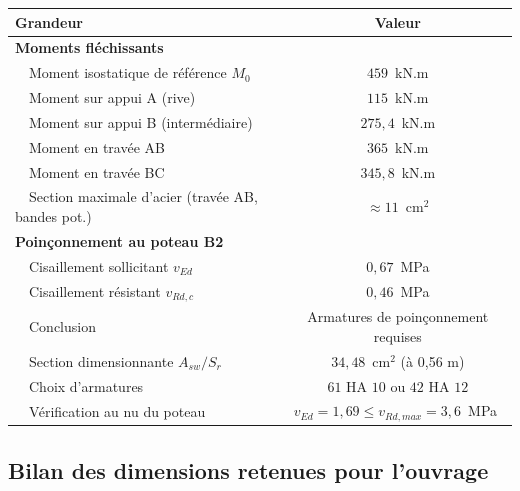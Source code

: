\begin{tabularx}{\linewidth}{Xc}
\toprule
\textbf{Grandeur} & \textbf{Valeur} \\
\midrule
\textbf{Moments fléchissants}                          & \\
~~Moment isostatique de référence $M_0$                & $459$~kN.m \\
~~Moment sur appui A (rive)                            & $115$~kN.m \\
~~Moment sur appui B (intermédiaire)                   & $275{,}4$~kN.m \\
~~Moment en travée AB                                  & $365$~kN.m \\
~~Moment en travée BC                                  & $345{,}8$~kN.m \\
~~Section maximale d'acier (travée AB, bandes pot.)    & $\approx 11$~cm$^{2}$ \\
\midrule
\textbf{Poinçonnement au poteau B2}                    & \\
~~Cisaillement sollicitant $v_{Ed}$                    & $0{,}67$~MPa \\
~~Cisaillement résistant $v_{Rd,c}$                     & $0{,}46$~MPa \\
~~Conclusion                                            & Armatures de poinçonnement requises \\
~~Section dimensionnante $A_{sw}/S_r$                   & $34{,}48$~cm$^{2}$ (à 0{,}56 m) \\
~~Choix d'armatures                                     & $61$ HA $10$ ou $42$ HA $12$ \\
~~Vérification au nu du poteau                          & $v_{Ed} = 1{,}69 \leq v_{Rd,max} = 3{,}6$~MPa \quad $$ \\
\bottomrule
\end{tabularx}

\subsection*{Bilan des dimensions retenues pour l'ouvrage}

